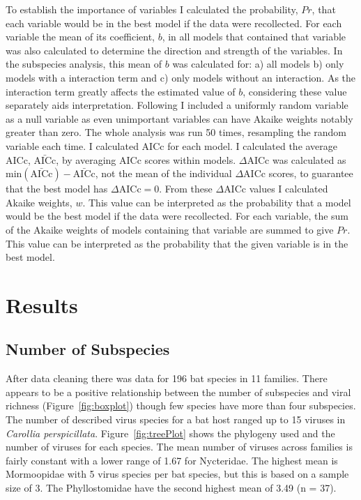 To establish the importance of variables I calculated the probability, $Pr$, that each variable would be in the best model if the data were recollected.
For each variable the mean of its coefficient, $b$, in all models that contained that variable was also calculated to determine the direction and strength of the variables.
In the subspecies analysis, this mean of $b$ was calculated for: a) all models b) only models with a interaction term and c) only models without an interaction.
As the interaction term greatly affects the estimated value of $b$, considering these value separately aids interpretation.
Following \cite{whittingham2005habitat} I included a uniformly random variable as a null variable as even unimportant variables can have Akaike weights notably greater than zero.
The whole analysis was run 50 times, resampling the random variable each time.
I calculated AICc for each model.
I calculated the average AICc, $\bar{\text{AICc}}$, by averaging AICc scores within models.
$\Delta\text{AICc}$ was calculated as $\text{min}(\bar{\text{AICc}}) - \bar{\text{AICc}}$, not the mean of the individual $\Delta\text{AICc}$ scores, to guarantee that the best model has $\Delta\text{AICc} = 0$.
From these $\Delta\text{AICc}$ values I calculated Akaike weights, $w$.
This value can be interpreted as the probability that a model would be the best model if the data were recollected.
For each variable, the sum of the Akaike weights of models containing that variable are summed to give $Pr$.
This value can be interpreted as the probability that the given variable is in the best model.




\section{Results}


\subsection{Number of Subspecies}

After data cleaning there was data for 196 bat species in 11 families.
There appears to be a positive relationship between the number of subspecies and viral richness (Figure~\ref{fig:boxplot}) though few species have more than four subspecies. 
The number of described virus species for a bat host ranged up to 15 viruses in \emph{Carollia perspicillata}.
Figure~\ref{fig:treePlot} shows the phylogeny used and the number of viruses for each species.
The mean number of viruses across families is fairly constant with a lower range of 1.67 for Nycteridae.
The highest mean is Mormoopidae with 5 virus species per bat species, but this is based on a sample size of 3.
The Phyllostomidae have the second highest mean  of 3.49 (n = 37).

